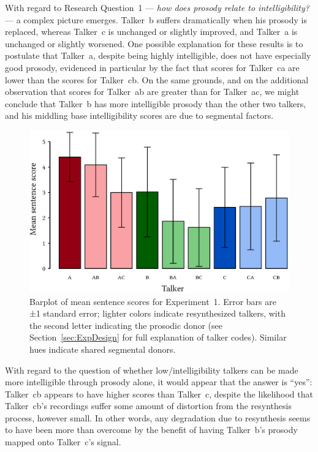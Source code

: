 With regard to Research Question~1 — \emph{how does prosody relate to intelligibility?} — a complex picture emerges.  Talker~\ac{b} suffers dramatically when his prosody is replaced, whereas Talker~\ac{c} is unchanged or slightly improved, and Talker~\ac{a} is unchanged or slightly worsened.  One possible explanation for these results is to postulate that Talker~\ac{a}, despite being highly intelligible, does not have especially good prosody, evidenced in particular by the fact that scores for Talker~\ac{ca} are lower than the scores for Talker~\ac{cb}.  On the same grounds, and on the additional observation that scores for Talker~\ac{ab} are greater than for Talker~\ac{ac}, we might conclude that Talker~\ac{b} has more intelligible prosody than the other two talkers, and his middling base intelligibility scores are due to segmental factors.

\begin{figure}[bt]
	\begin{centering}
	\includegraphics{figures/results/ExpOneBarplot.eps}
	\caption[Barplot of mean sentence scores for Experiment~1]{Barplot of mean sentence scores for Experiment~1.  Error bars are ±1 standard error; lighter colors indicate resynthesized talkers, with the second letter indicating the prosodic donor (see Section~\ref{sec:ExpDesign} for full explanation of talker codes).  Similar hues indicate shared segmental donors.\label{fig:ExpOneBarplot}}
	\end{centering}
\end{figure}

With regard to the question of whether low\-/intelligibility talkers can be made more intelligible through prosody alone, it would appear that the answer is “yes”: Talker~\ac{cb} appears to have higher scores than Talker~\ac{c}, despite the likelihood that Talker~\ac{cb}’s recordings suffer some amount of distortion from the resynthesis process, however small.  In other words, any degradation due to resynthesis seems to have been more than overcome by the benefit of having Talker~\ac{b}’s prosody mapped onto Talker~\ac{c}’s signal.

